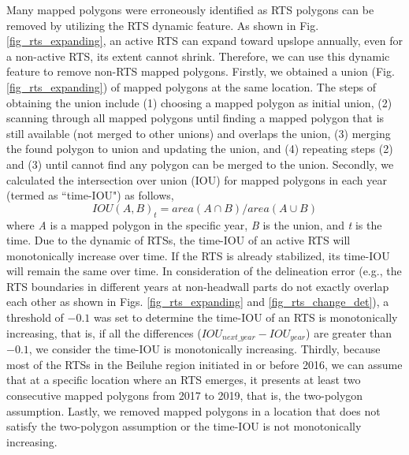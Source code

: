 \documentclass[authoryear,preprint,review,12pt]{elsarticle}
\begin{document}
Many mapped polygons were erroneously identified as RTS polygons can be removed by utilizing the RTS dynamic feature. 
As shown in Fig. \ref{fig_rts_expanding}, an active RTS can expand toward upslope annually, even for a non-active RTS, its extent cannot shrink. 
Therefore, we can use this dynamic feature to remove non-RTS mapped polygons. 
Firstly, we obtained a union (Fig. \ref{fig_rts_expanding}) of mapped polygons at the same location.
The steps of obtaining the union include (1) choosing a mapped polygon as initial union, (2) scanning through all mapped polygons until finding a mapped polygon that is still available (not merged to other unions) and overlaps the union, (3) merging the found polygon to union and updating the union, and (4) repeating steps (2) and (3) until cannot find any polygon can be merged to the union. 
Secondly, we calculated the intersection over union (IOU) for mapped polygons in each year (termed as ``time-IOU") as follows, 
\begin{equation}
IOU(A,B)_{t}=area(A \cap B)/area(A \cup B)
\label{equ_time_iou}
\end{equation}
where \emph{A} is a mapped polygon in the specific year, \emph{B} is the union, and \emph{t} is the time. 
Due to the dynamic of RTSs, the time-IOU of an active RTS will monotonically increase over time. 
If the RTS is already stabilized, its time-IOU will remain the same over time. 
In consideration of the delineation error (e.g., the RTS boundaries in different years at non-headwall parts do not exactly overlap each other as shown in Figs. \ref{fig_rts_expanding} and \ref{fig_rts_change_det}), a threshold of $-0.1$ was set to determine the time-IOU of an RTS is monotonically increasing, that is, if all the differences ($IOU_{next\_year}-IOU_{year}$) are greater than $-0.1$, we consider the time-IOU is monotonically increasing. 
Thirdly, because most of the RTSs in the Beiluhe region initiated in or before 2016,
we can assume that at a specific location where an RTS emerges, it  presents at least two consecutive mapped polygons from 2017 to 2019, that is, the two-polygon assumption. 
Lastly, we removed mapped polygons in a location that does not satisfy the two-polygon assumption or the time-IOU is not monotonically increasing.
 
\end{document}
